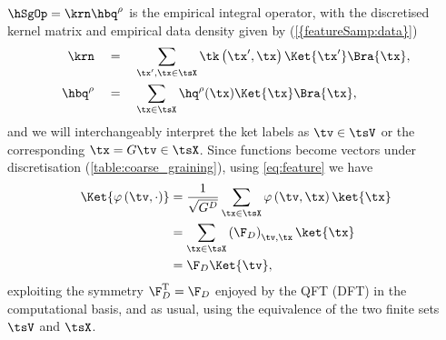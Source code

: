   $\hSgOp=\krn \hbq^{\rho}$ is the empirical integral operator, with the discretised kernel matrix and empirical data density given by (\cref{{featureSamp:data}})
  \begin{align*}
    \krn \quad &= \quad \sum_{\tx',\tx\in\tsX}\tk\left(\tx',\tx\right)\Ket{\tx'}\Bra{\tx},\\
    \hbq^{\rho} \quad &=\quad \sum_{\tx\in\tsX}\hq^{\rho}(\tx)\Ket{\tx}\Bra{\tx},
  \end{align*}
  and we will interchangeably interpret the ket labels as $\tv\in\tsV$ or the corresponding $\tx=G\tv\in\tsX$.
Since functions become vectors under discretisation (\cref{table:coarse_graining}), using \cref{eq:feature} we have
\begin{align*}
  \Ket{\varphi\left(\tv,\cdot\right)} &= \frac{1}{\sqrt{{G}^D}}\sum_{\tx\in\tsX}\varphi\left(\tv,\tx\right)\ket{\tx}\\
                                      &= \sum_{\tx\in\tsX}\left(\F_D\right)_{\tv,\tx}\ket{\tx}\\
                                      &= \F_{D}\Ket{\tv},
\end{align*}
exploiting the symmetry $\F_D^\mathrm{T}=\F_D$ enjoyed by the QFT (DFT) in the computational basis, and as usual, using the equivalence of the two finite sets $\tsV$ and $\tsX$. 

